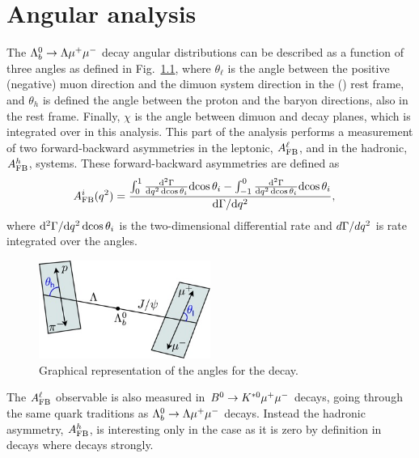 \chapter{Angular analysis}

The $\Lambda^0_b\rightarrow\Lambda\mu^+\mu^-$ decay angular distributions can be described as a function of three angles
as defined in Fig.~\ref{fig:Lb_angles}, where $\theta_\ell$ is the angle between the positive
(negative) muon direction and the dimuon system direction in the \Lb(\Lbbar) rest frame,
and $\theta_h$ is defined the angle between the proton and the \Lz baryon directions, also in the
\Lb rest frame. Finally, $\chi$ is the angle between dimuon and \Lz decay planes, which is integrated
over in this analysis. %
This part of the analysis performs a measurement of two forward-backward asymmetries in the leptonic,
$A_{\rm FB}^\ell$, and in the hadronic, $A_{\rm FB}^h$, systems. These forward-backward asymmetries
are defined as
\begin{align}
A_{\rm FB}^i(q^2)&=\frac{\int_0^1 \frac{\mathrm{d}^2\Gamma}{\mathrm{d}q^2\,\mathrm{d}\!\cos\theta_i} \mathrm{d}\!\cos\theta_i-
               \int^0_{-1} \frac{\mathrm{d}^2\Gamma}{\mathrm{d}q^2\,\mathrm{d}\!\cos\theta_i} \mathrm{d}\!\cos\theta_i}{\mathrm{d}\Gamma / \mathrm{d} q^2},
\label{eq:afbTh}
\end{align}
where $\mathrm{d}^2\Gamma/\mathrm{d} q^2\,\mathrm{d}\!\cos\theta_i$ is the two-dimensional differential rate and
$d\Gamma / dq^2$ is rate integrated over the angles. 

\begin{figure}[h!]
\centering
\includegraphics[width=0.5\textwidth]{Lmumu/figs/angles.jpeg}
\caption{Graphical representation of the angles for the \decay{\Lb}{\Lz\mumu} decay.}
\label{fig:Lb_angles}
\end{figure}

The $A_{\rm FB}^\ell$ observable is also measured in $B^0\rightarrow K^{*0}\mu^+\mu^-$ decays,
going through the same quark traditions as $\Lambda^0_b\rightarrow\Lambda\mu^+\mu^-$ decays. Instead the hadronic
asymmetry, $A_{\rm FB}^h$, is interesting only in the \Lb case as it is zero by definition
in \Bz decays where \Kstarz decays strongly.

